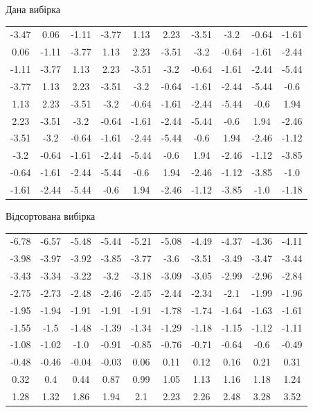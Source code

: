 \documentclass[14pt, a4paper, ukrainian]{extreport}
\begin{document}
	\begin{center}
		Дана вибірка \linebreak
		
		\begin{tabular} {c c c c c c c c c c}
			-3.47 & 0.06 & -1.11 & -3.77 & 1.13 & 2.23 & -3.51 & -3.2 & -0.64 & -1.61 \\ 
			0.06 & -1.11 & -3.77 & 1.13 & 2.23 & -3.51 & -3.2 & -0.64 & -1.61 & -2.44 \\ 
			-1.11 & -3.77 & 1.13 & 2.23 & -3.51 & -3.2 & -0.64 & -1.61 & -2.44 & -5.44 \\ 
			-3.77 & 1.13 & 2.23 & -3.51 & -3.2 & -0.64 & -1.61 & -2.44 & -5.44 & -0.6 \\ 
			1.13 & 2.23 & -3.51 & -3.2 & -0.64 & -1.61 & -2.44 & -5.44 & -0.6 & 1.94 \\ 
			2.23 & -3.51 & -3.2 & -0.64 & -1.61 & -2.44 & -5.44 & -0.6 & 1.94 & -2.46 \\ 
			-3.51 & -3.2 & -0.64 & -1.61 & -2.44 & -5.44 & -0.6 & 1.94 & -2.46 & -1.12 \\ 
			-3.2 & -0.64 & -1.61 & -2.44 & -5.44 & -0.6 & 1.94 & -2.46 & -1.12 & -3.85 \\ 
			-0.64 & -1.61 & -2.44 & -5.44 & -0.6 & 1.94 & -2.46 & -1.12 & -3.85 & -1.0 \\ 
			-1.61 & -2.44 & -5.44 & -0.6 & 1.94 & -2.46 & -1.12 & -3.85 & -1.0 & -1.18 
		\end{tabular}
	\end{center}
	
	\begin{center}
		Відсортована вибірка \linebreak
		
		\begin{tabular} {c c c c c c c c c c}
		 -6.78 & -6.57 & -5.48 & -5.44 & -5.21 & -5.08 & -4.49 & -4.37 & -4.36 & -4.11 \\
		 -3.98 & -3.97 & -3.92 & -3.85 & -3.77 & -3.6 & -3.51 & -3.49 & -3.47 & -3.44 \\
		 -3.43 & -3.34 & -3.22 & -3.2 & -3.18 & -3.09 & -3.05 & -2.99 & -2.96 & -2.84 \\
		 -2.75 & -2.73 & -2.48 & -2.46 & -2.45 & -2.44 & -2.34 & -2.1 & -1.99 & -1.96 \\
		 -1.95 & -1.94 & -1.91 & -1.91 & -1.91 & -1.78 & -1.74 & -1.64 & -1.63 & -1.61 \\
		 -1.55 & -1.5 & -1.48 & -1.39 & -1.34 & -1.29 & -1.18 & -1.15 & -1.12 & -1.11 \\
		 -1.08 & -1.02 & -1.0 & -0.91 & -0.85 & -0.76 & -0.71 & -0.64 & -0.6 & -0.49 \\
		 -0.48 & -0.46 & -0.04 & -0.03 & 0.06 & 0.11 & 0.12 & 0.16 & 0.21 & 0.31 \\
		 0.32 & 0.4 & 0.44 & 0.87 & 0.99 & 1.05 & 1.13 & 1.16 & 1.18 & 1.24 \\
		 1.28 & 1.32 & 1.86 & 1.94 & 2.1 & 2.23 & 2.26 & 2.48 & 3.28 & 3.52
	\end{tabular}
	\end{center}
\end{document}
